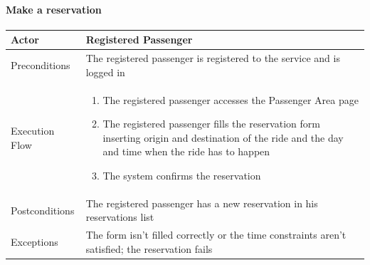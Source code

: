 \paragraph{Make a reservation}
\begin{center}
	\begin{tabular}{ | l | p{8cm} |}
		\hline
		Actor &  Registered Passenger	\\ \hline
		Preconditions & The registered passenger is registered to the service and is logged in	\\ \hline
		Execution Flow & \begin{enumerate}
			\item The registered passenger accesses the Passenger Area page
			\item The registered passenger fills the reservation form inserting origin and destination of the ride and the day and time when the ride has to happen
			\item The system confirms the reservation
		\end{enumerate}		\\ \hline
		Postconditions & The registered passenger has a new reservation in his reservations list	\\ \hline
		Exceptions & The form isn't filled correctly or the time constraints aren't satisfied; the reservation fails \\ \hline
	\end{tabular}
\end{center}
\newpage
